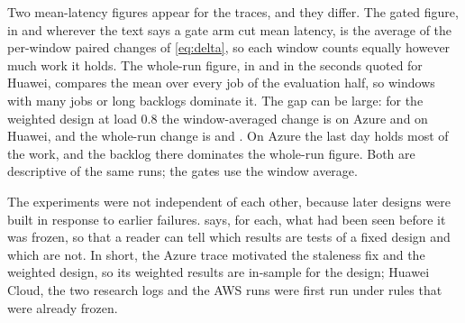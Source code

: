 Two mean-latency figures appear for the traces, and they differ. The gated figure, in  and wherever the text says a gate arm cut mean latency, is the average of the per-window paired changes of \cref{eq:delta}, so each window counts equally however much work it holds. The whole-run figure, in  and in the seconds quoted for Huawei, compares the mean over every job of the evaluation half, so windows with many jobs or long backlogs dominate it. The gap can be large: for the weighted design at load 0.8 the window-averaged change is \ReplayAzureBEight{} on Azure and \ReplayHuaweiBEight{} on Huawei, and the whole-run change is \ReplayAzureWholeBEight{} and \ReplayHuaweiWholeBEight{}. On Azure the last day holds most of the work, and the backlog there dominates the whole-run figure. Both are descriptive of the same runs; the gates use the window average.



The experiments were not independent of each other, because later designs were built in response to earlier failures.  says, for each, what had been seen before it was frozen, so that a reader can tell which results are tests of a fixed design and which are not. In short, the Azure trace motivated the staleness fix and the weighted design, so its weighted results are in-sample for the design; Huawei Cloud, the two research logs and the AWS runs were first run under rules that were already frozen.


